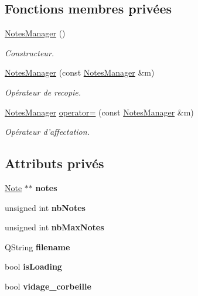 \subsection*{Fonctions membres privées}
\begin{DoxyCompactItemize}
\item 
\hyperlink{class_notes_manager_ae76158ef3dc4866af94c1e562e9a5213}{Notes\-Manager} ()
\begin{DoxyCompactList}\small\item\em Constructeur. \end{DoxyCompactList}\item 
\hyperlink{class_notes_manager_ae5d67a3b447560caf3fe3d5ed497d34f}{Notes\-Manager} (const \hyperlink{class_notes_manager}{Notes\-Manager} \&m)
\begin{DoxyCompactList}\small\item\em Opérateur de recopie. \end{DoxyCompactList}\item 
\hyperlink{class_notes_manager}{Notes\-Manager} \hyperlink{class_notes_manager_abb12b467d66f58b3e72729999d6dfd19}{operator=} (const \hyperlink{class_notes_manager}{Notes\-Manager} \&m)
\begin{DoxyCompactList}\small\item\em Opérateur d'affectation. \end{DoxyCompactList}\end{DoxyCompactItemize}
\subsection*{Attributs privés}
\begin{DoxyCompactItemize}
\item 
\hypertarget{class_notes_manager_a411bfaff16f1b54d5d58470ff2154531}{\hyperlink{class_note}{Note} $\ast$$\ast$ {\bfseries notes}}\label{class_notes_manager_a411bfaff16f1b54d5d58470ff2154531}

\item 
\hypertarget{class_notes_manager_a0a79a3dc550fd7ac83cef8c6840dedad}{unsigned int {\bfseries nb\-Notes}}\label{class_notes_manager_a0a79a3dc550fd7ac83cef8c6840dedad}

\item 
\hypertarget{class_notes_manager_a3d542b3a88228e4f0807ac9dcddf59c8}{unsigned int {\bfseries nb\-Max\-Notes}}\label{class_notes_manager_a3d542b3a88228e4f0807ac9dcddf59c8}

\item 
\hypertarget{class_notes_manager_a0c4a0db9862d63a15921b58def75c2d0}{Q\-String {\bfseries filename}}\label{class_notes_manager_a0c4a0db9862d63a15921b58def75c2d0}

\item 
\hypertarget{class_notes_manager_a26f936377d1ce00bc2b0aceca8b0569e}{bool {\bfseries is\-Loading}}\label{class_notes_manager_a26f936377d1ce00bc2b0aceca8b0569e}

\item 
\hypertarget{class_notes_manager_a68bfa57f8484d3a95d29b44dad6a3399}{bool {\bfseries vidage\-\_\-corbeille}}\label{class_notes_manager_a68bfa57f8484d3a95d29b44dad6a3399}

\end{DoxyCompactItemize}


